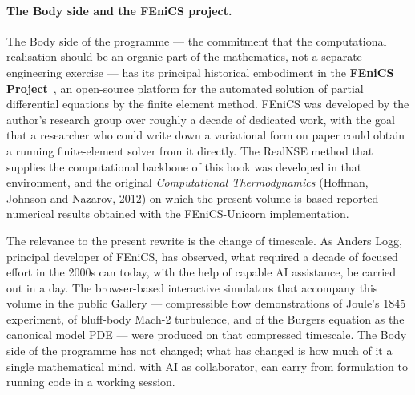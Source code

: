 \paragraph{The Body side and the FEniCS project.}
The Body side of the programme --- the commitment that the computational realisation should be an organic part of the mathematics, not a separate engineering exercise --- has its principal historical embodiment in the \textbf{FEniCS Project}~\cite{FEniCS2012}, an open-source platform for the automated solution of partial differential equations by the finite element method. FEniCS was developed by the author's research group over roughly a decade of dedicated work, with the goal that a researcher who could write down a variational form on paper could obtain a running finite-element solver from it directly. The RealNSE method that supplies the computational backbone of this book was developed in that environment, and the original \emph{Computational Thermodynamics} (Hoffman, Johnson and Nazarov, 2012) on which the present volume is based reported numerical results obtained with the FEniCS-Unicorn implementation.

The relevance to the present rewrite is the change of timescale. As Anders Logg, principal developer of FEniCS, has observed, what required a decade of focused effort in the 2000s can today, with the help of capable AI assistance, be carried out in a day. The browser-based interactive simulators that accompany this volume in the public Gallery --- compressible flow demonstrations of Joule's 1845 experiment, of bluff-body Mach-2 turbulence, and of the Burgers equation as the canonical model PDE --- were produced on that compressed timescale. The Body side of the programme has not changed; what has changed is how much of it a single mathematical mind, with AI as collaborator, can carry from formulation to running code in a working session.

